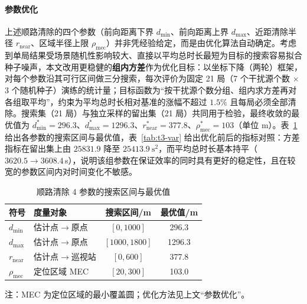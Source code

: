 \documentclass[UTF8, zihao=5,AutoFakeBold=2]{ctexart}
\begin{document}
\paragraph{参数优化}
上述顺路清除的四个参数（前向距离下界 \(d_{\min}\)、前向距离上界 \(d_{\max}\)、近距清除半径 \(r_{\text{near}}\)、区域半径上限 \(\rho_{\text{mec}}\)）并非凭经验给定，而是由优化算法自动确定。考虑到单局结果受场景随机性影响较大、直接以平均总时长最短为目标的搜索容易拟合种子噪声，本文改用更稳健的\textbf{组内方差}作为优化目标：以坐标下降（两轮）框架，对每个参数沿其可行区间做三分搜索，每次评价为固定 21 局（7 个干扰源个数 \(\times\) 3 个随机种子）演练的统计量；目标函数为“按干扰源个数分组、组内求方差再对各组取平均”，约束为平均总时长相对基准的涨幅不超过 \(1.5\%\) 且每局必须全部清除。搜索集（21 局）与独立采样的留出集（21 局）共同用于检验，最终收敛的最优值为 \(d_{\min}^*=296.3\)、\(d_{\max}^*=1296.3\)、\(r_{\text{near}}^*=377.8\)、\(\rho_{\text{mec}}^*=103\)（单位 m）。表~\ref{tab:t3-inline} 给出各参数的搜索区间与最优值，表~\ref{tab:t3-var} 给出优化前后的指标对照：方差指标在留出集上由 \(25831.9\) 降至 \(25413.9\ \text{s}^2\)，而平均总时长基本持平（\(3620.5\to3608.4\)\,s），说明该组参数在保证效率的同时具有更好的稳定性，且在较宽的参数区间内对时间变化不敏感。

\begin{table}[H]
    \centering
    \caption{顺路清除 4 参数的搜索区间与最优值}
    \label{tab:t3-inline}
    \begin{tabular}{llcc}
        \toprule
        符号 & 度量对象 & 搜索区间/m & 最优值/m \\
        \midrule
        \(d_{\min}\) & 估计点\(\to\)原点 & \([0,1000]\) & 296.3 \\
        \(d_{\max}\) & 估计点\(\to\)原点 & \([1000,1800]\) & 1296.3 \\
        \(r_{\text{near}}\) & 估计点\(\to\)巡视站 & \([0,600]\) & 377.8 \\
        \(\rho_{\text{mec}}\) & 定位区域 MEC & \([20,300]\) & 103.0 \\
        \bottomrule
    \end{tabular}
    \par\smallskip
    \footnotesize{注：MEC 为定位区域的最小覆盖圆；优化方法见上文“参数优化”。}
\end{table}
\end{document}
